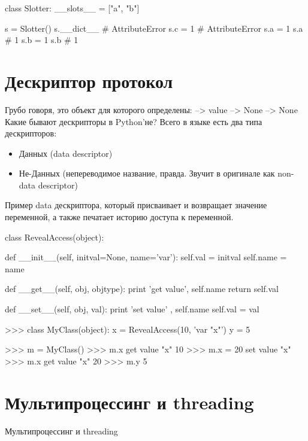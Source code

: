 	\begin{python}
class Slotter:
    __slots__ = ["a", "b"]

s = Slotter()
s.__dict__      # AttributeError
s.c = 1         # AttributeError
s.a = 1
s.a             # 1
s.b = 1
s.b             # 1
	\end{python}

\section{Дескриптор протокол}	

Грубо говоря, это объект для которого определены:
 --> value
 --> None
 --> None
Какие бывают дескрипторы в Python'не?
Всего в языке есть два типа дескрипторов:
\begin{itemize}
	\item Данных (data descriptor)
	\item Не-Данных (непереводимое название, правда. Звучит в оригинале как non-data descriptor)
\end{itemize}


Пример data дескриптора, который присваивает и возвращает значение переменной, а также печатает историю доступа к переменной.

	\begin{python}
class RevealAccess(object):

    def __init__(self, initval=None, name='var'):
        self.val = initval
        self.name = name

    def __get__(self, obj, objtype):
        print 'get value', self.name
        return self.val

    def __set__(self, obj, val):
        print 'set value' , self.name
        self.val = val

>>> class MyClass(object):
    x = RevealAccess(10, 'var "x"')
    y = 5

>>> m = MyClass()
>>> m.x
get value "x"
10
>>> m.x = 20
set value "x"
>>> m.x
get value "x"
20
>>> m.y
5
\end{python}

\section{Мультипроцессинг и threading}

Мультипроцессинг и threading

